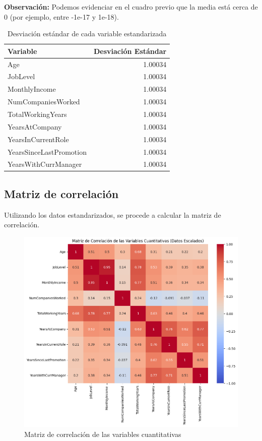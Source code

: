 \textbf{Observación:}
Podemos evidenciar en el cuadro previo que la media está 
cerca de 0 (por ejemplo, entre -1e-17 y 1e-18).

\begin{table}[H]
\centering
\begin{tabular}{|l|r|}
\hline
\textbf{Variable} & \textbf{Desviación Estándar} \\ \hline
Age                        & 1.00034 \\ \hline
JobLevel                   & 1.00034 \\ \hline
MonthlyIncome              & 1.00034 \\ \hline
NumCompaniesWorked         & 1.00034 \\ \hline
TotalWorkingYears          & 1.00034 \\ \hline
YearsAtCompany             & 1.00034 \\ \hline
YearsInCurrentRole         & 1.00034 \\ \hline
YearsSinceLastPromotion    & 1.00034 \\ \hline
YearsWithCurrManager       & 1.00034 \\ \hline
\end{tabular}
\caption{Desviación estándar de cada variable estandarizada}
\end{table}

\subsection{Matriz de correlación}
Utilizando los datos estandarizados, se procede a calcular la matriz de correlación.

\begin{figure}[h!]
    \centering
    \includegraphics[width=1\textwidth]{images/matriz-de-correlacion.png}
    \caption{Matriz de correlación de las variables cuantitativas}
    \label{fig:matriz_correlacion}
\end{figure}

